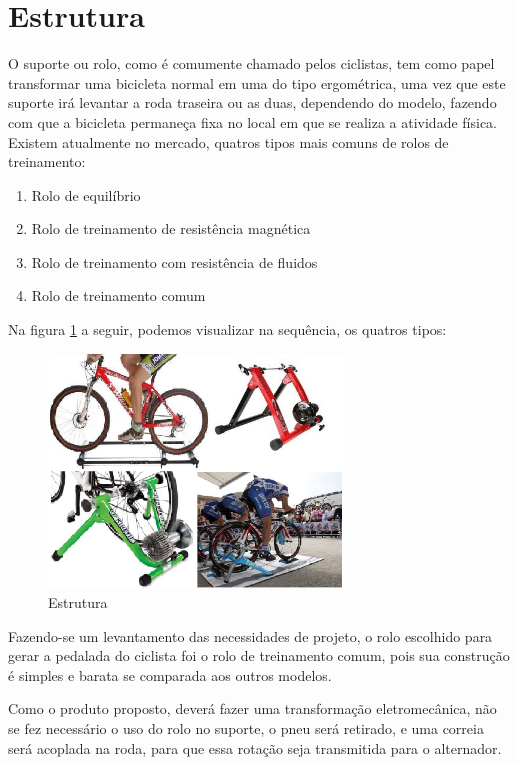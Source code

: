 \section{Estrutura} \label{Secao Estrutura}

O suporte ou rolo, como é comumente chamado pelos ciclistas, tem como papel transformar uma bicicleta normal em uma do tipo ergométrica, uma vez que este suporte irá levantar a roda traseira ou as duas, dependendo do modelo, fazendo com que a bicicleta permaneça fixa no local em que se realiza a atividade física.  Existem atualmente no mercado, quatros tipos mais comuns de rolos de treinamento:
\begin{enumerate}
    \item Rolo de equilíbrio
    \item Rolo de treinamento de resistência magnética
    \item Rolo de treinamento com resistência de fluidos
    \item Rolo de treinamento comum
\end{enumerate}

Na figura \ref{fig:rolos} a seguir, podemos visualizar na sequência, os quatros tipos:

\begin{figure}[h]
    \centering
    \includegraphics[width=0.7\textwidth]{figuras/rolos.png}
    \caption{Estrutura}
    \label{fig:rolos}
\end{figure}

Fazendo-se um levantamento das necessidades de projeto, o rolo escolhido para gerar a pedalada do ciclista foi o rolo de treinamento comum, pois sua construção é simples e barata se comparada aos outros modelos. 

Como o produto proposto, deverá fazer uma transformação eletromecânica, não se fez necessário o uso do rolo no suporte,  o pneu será retirado, e uma correia será acoplada na roda, para que essa rotação seja transmitida para o alternador. 


